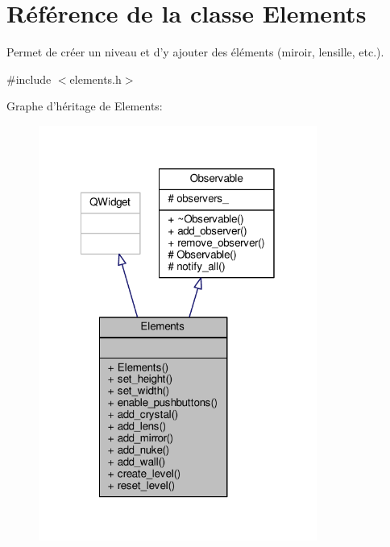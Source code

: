 \hypertarget{classElements}{\section{Référence de la classe Elements}
\label{classElements}
}


Permet de créer un niveau et d’y ajouter des éléments (miroir, lensille, etc.).  




{\ttfamily \#include $<$elements.\+h$>$}



Graphe d'héritage de Elements\+:
\nopagebreak
\begin{figure}[H]
\begin{center}
\leavevmode
\includegraphics[width=259pt]{da/d2c/classElements__inherit__graph}
\end{center}
\end{figure}


